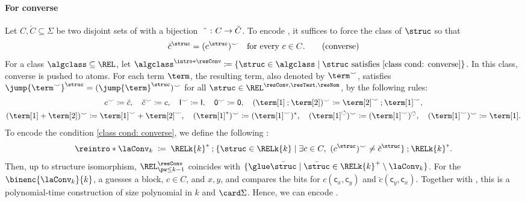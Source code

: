 \documentclass[a4paper,UKenglish,cleveref, autoref, thm-restate]{lipics-v2021}
\DeclarePairedDelimiter\set{\{}{\}}
\newcommand{\const}[1]{\mathsf{#1}}
\newcommand{\defeq}{\coloneq}
\newcommand{\mul}[1]{\bar{#1}}
\newcommand{\union}{\mathbin{+}}
\newcommand{\id}{\const{I}}
\newcommand{\emp}{\const{0}}
\newcommand{\compo}{\mathbin{;}}
\newcommand{\lop}{\circlearrowleft}
\newcommand{\vsig}{\Sigma}
\begin{document}
\paragraph*{For converse}
Let $C, \breve{C} \subseteq \vsig$ be two disjoint sets of  with a bijection $\breve{\mbox{\quad}} \colon C \to \breve{C}$.
To encode \intro*{}, it suffices to force the class of  $\struc$
so that
\begin{align*}
\breve{c}^{\struc} = (c^{\struc})^{\smile} \text{\quad for every $c \in C$.} \tag{converse}\label{class cond: converse}
\end{align*}
\AP
For a class $\algclass \subseteq \REL$,
let $\algclass^{\intro*\resConv} \defeq \set{\struc \in \algclass \mid \text{$\struc$ satisfies \eqref{class cond: converse}}}$.
In this class, converse is pushed to atoms.
For each term $\term$, the resulting term, also denoted by $\term^{\smile}$, satisfies
$\jump{\term^{\smile}}^{\struc} = (\jump{\term}^{\struc})^{\smile}$ for all
$\struc \in \REL^{\resConv,\resTest,\resNom}$, by the following rules:
\begin{gather*}
    c^{\smile} \defeq \breve{c}, \quad
    \breve{c}^{\smile} \defeq c, \quad
    \id^{\smile} \defeq \id, \quad
    \emp^{\smile} \defeq \emp, \quad
    (\term[1] \compo \term[2])^{\smile} \defeq \term[2]^{\smile} \compo \term[1]^{\smile}, \\
    (\term[1] \union \term[2])^{\smile} \defeq \term[1]^{\smile} \union \term[2]^{\smile}, \quad
    (\term[1]^{*})^{\smile} \defeq (\term[1]^{\smile})^{*}, \quad
    (\term[1]^{\lop})^{\smile} \defeq (\term[1]^{\smile})^{\lop}, \quad
    (\term[1]^{\smile})^{\smile} \defeq \term[1].
\end{gather*}
To encode the condition \eqref{class cond: converse}, we define the following :
\AP
{}
\[\reintro*\laConv_{k} \;\defeq\;
\RELk{k}^{*} \compo
\set{\struc \in \RELk{k} \mid \exists c \in C,\ (c^{\struc})^{\smile} \neq \breve{c}^{\struc} } \compo 
\RELk{k}^{*}.\]
Then, up to structure isomorphism,
$\REL^{\resConv}_{\pw \le k-1}$ coincides with
$\set{\glue \mul{\struc} \mid \mul{\struc} \in \RELk{k}^{+} \setminus \laConv_{k}}$.
For the  $\binenc{\laConv_{k}}{k}$,
a  guesses a block, $c\in C$, and $x,y$, and compares the bits for
$c(\const{c}_x,\const{c}_y)$ and $\breve c(\const{c}_y,\const{c}_x)$.
Together with , this is a polynomial-time construction
of size polynomial in $k$ and $\card\vsig$.
Hence, we can encode .
\end{document}
